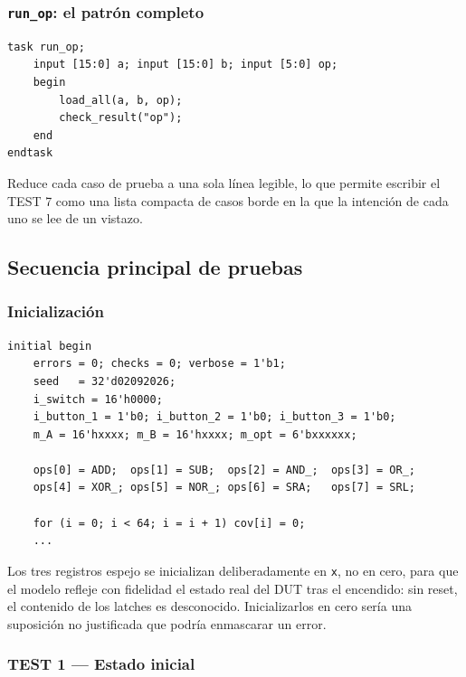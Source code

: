 \documentclass[12pt,a4paper]{article}
\begin{document}
\subsubsection{\texttt{run\_op}: el patrón completo}

\begin{lstlisting}[caption={Ejecución y verificación de una operación.}]
task run_op;
    input [15:0] a; input [15:0] b; input [5:0] op;
    begin
        load_all(a, b, op);
        check_result("op");
    end
endtask
\end{lstlisting}

Reduce cada caso de prueba a una sola línea legible, lo que permite escribir el
TEST 7 como una lista compacta de casos borde en la que la intención de cada uno
se lee de un vistazo.

\subsection{Secuencia principal de pruebas}

\subsubsection{Inicialización}

\begin{lstlisting}[caption={Bloque \texttt{initial} de arranque.}]
initial begin
    errors = 0; checks = 0; verbose = 1'b1;
    seed   = 32'd02092026;
    i_switch = 16'h0000;
    i_button_1 = 1'b0; i_button_2 = 1'b0; i_button_3 = 1'b0;
    m_A = 16'hxxxx; m_B = 16'hxxxx; m_opt = 6'bxxxxxx;

    ops[0] = ADD;  ops[1] = SUB;  ops[2] = AND_;  ops[3] = OR_;
    ops[4] = XOR_; ops[5] = NOR_; ops[6] = SRA;   ops[7] = SRL;

    for (i = 0; i < 64; i = i + 1) cov[i] = 0;
    ...
\end{lstlisting}

Los tres registros espejo se inicializan deliberadamente en \texttt{x}, no en
cero, para que el modelo refleje con fidelidad el estado real del DUT tras el
encendido: sin reset, el contenido de los latches es desconocido. Inicializarlos
en cero sería una suposición no justificada que podría enmascarar un error.

\subsubsection{TEST 1 --- Estado inicial}
\end{document}
